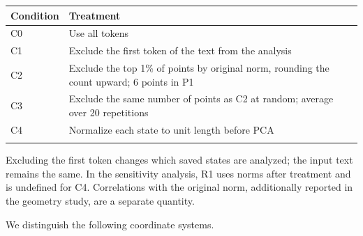 \begingroup
\fontsize{9.3}{12}\selectfont\setlength{\tabcolsep}{3.3pt}
{
\begin{longtable}[]{@{}
  >{\raggedright\arraybackslash}p{}
  >{\raggedright\arraybackslash}p{}@{}}
\toprule\noalign{}
\begin{minipage}[b]{\linewidth}\raggedright
Condition
\end{minipage} & \begin{minipage}[b]{\linewidth}\raggedright
Treatment
\end{minipage} \\
\midrule\noalign{}
\endhead
\bottomrule\noalign{}
\endlastfoot
C0 & Use all tokens \\*
C1 & Exclude the first token of the text from the analysis \\*
C2 & Exclude the top 1\% of points by original norm, rounding the count upward; 6 points in P1 \\*
C3 & Exclude the same number of points as C2 at random; average over 20 repetitions \\*
C4 & Normalize each state to unit length before PCA \\*
\end{longtable}
}
\endgroup

Excluding the first token changes which saved states are analyzed; the input text remains the same. In the sensitivity analysis, R1 uses norms after treatment and is undefined for C4. Correlations with the original norm, additionally reported in the geometry study, are a separate quantity.

We distinguish the following coordinate systems.

